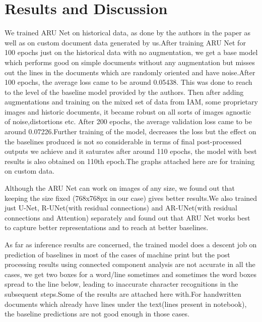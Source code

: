 %

{\let\clearpage\relax \chapter{Results and Discussion}}

We trained ARU Net on historical data, as done by the authors in the paper as well as on custom document data generated by us.After training ARU Net for 100 epochs just on the historical data with no augmentation, we get a base model which performs good on simple documents without any augmentation but misses out the lines in the documents which are randomly oriented and have noise.After 100 epochs, the average loss came to be around 0.05438. This was done to reach to the level of the baseline model provided by the authors. Then after adding augmentations and training on the mixed set of data from IAM, some proprietary images and historic documents, it became robust on all sorts of images agnostic of noise,distortions etc. After 200 epochs, the average validation loss came to be around 0.07226.Further training of the model, decreases the loss but the effect on the baselines produced is not so considerable in terms of final post-processed outputs we achieve and it saturates after around 110 epochs, the model with best results is also obtained on 110th epoch.The graphs attached here are for training on custom data.

Although the ARU Net can work on images of any size, we found out that keeping the size fixed (768x768px in our case)  gives better results.We also trained just U-Net, R-UNet(with residual connections) and AR-UNet(with residual connections and Attention) separately and found out that ARU Net works best to capture better representations and to reach at better baselines.

As far as inference results are concerned, the trained model does a descent job on prediction of baselines in most of the cases of machine print but the post processing results using connected component analysis are not accurate in all the cases, we get two boxes for a word/line sometimes and sometimes the word boxes spread to the line below, leading to inaccurate character recognitions in the subsequent steps.Some of the results are attached here with.For handwritten documents which already have lines under the text(lines present in notebook), the baseline predictions are not good enough in those cases.

